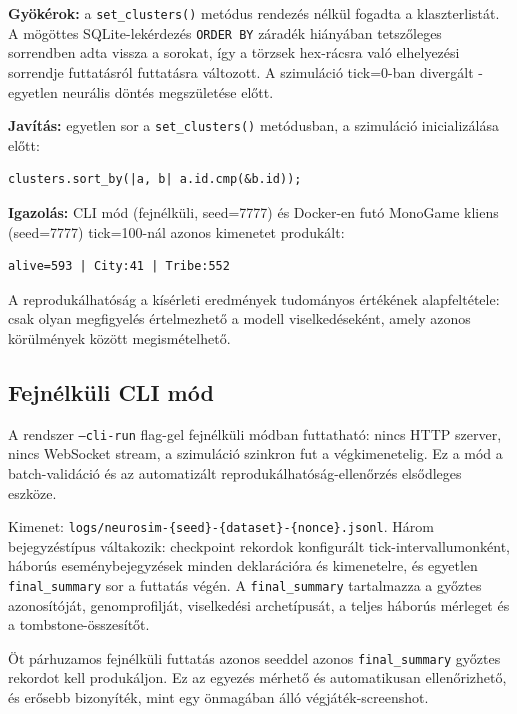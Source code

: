 ﻿\documentclass[a4paper,12pt]{report}
\begin{document}
\textbf{Gyökérok:} a \texttt{set\_clusters()} metódus rendezés nélkül fogadta
a klaszterlistát. A mögöttes SQLite-lekérdezés \texttt{ORDER BY} záradék hiányában
tetszőleges sorrendben adta vissza a sorokat, így a törzsek hex-rácsra való
elhelyezési sorrendje futtatásról futtatásra változott.
A szimuláció tick=0-ban divergált - egyetlen neurális döntés megszületése előtt.

\textbf{Javítás:} egyetlen sor a \texttt{set\_clusters()} metódusban,
a szimuláció inicializálása előtt:

\begin{lstlisting}[language={},caption={Determinizmus-javítás: klaszterek rendezése azonosító szerint}]
clusters.sort_by(|a, b| a.id.cmp(&b.id));
\end{lstlisting}

\textbf{Igazolás:} CLI mód (fejnélküli, seed=7777) és Docker-en futó MonoGame kliens
(seed=7777) tick=100-nál azonos kimenetet produkált:

\begin{lstlisting}[language={},caption={Determinizmus-ellenőrzés: CLI és MonoGame egyező eredménye tick=100-nál}]
alive=593 | City:41 | Tribe:552
\end{lstlisting}

A reprodukálhatóság a kísérleti eredmények tudományos értékének alapfeltétele:
csak olyan megfigyelés értelmezhető a modell viselkedéseként, amely azonos
körülmények között megismételhető.

\subsection*{Fejnélküli CLI mód}

A rendszer \texttt{--cli-run} flag-gel fejnélküli módban futtatható:
nincs HTTP szerver, nincs WebSocket stream, a szimuláció szinkron fut
a végkimenetelig. Ez a mód a batch-validáció és az automatizált reprodukálhatóság-ellenőrzés
elsődleges eszköze.

Kimenet: \texttt{logs/neurosim-\{seed\}-\{dataset\}-\{nonce\}.jsonl}.
Három bejegyzéstípus váltakozik: checkpoint rekordok konfigurált tick-intervallumonként,
háborús eseménybejegyzések minden deklarációra és kimenetelre,
és egyetlen \texttt{final\_summary} sor a futtatás végén.
A \texttt{final\_summary} tartalmazza a győztes azonosítóját, genomprofilját,
viselkedési archetípusát, a teljes háborús mérleget és a tombstone-összesítőt.

Öt párhuzamos fejnélküli futtatás azonos seeddel azonos \texttt{final\_summary}
győztes rekordot kell produkáljon. Ez az egyezés mérhető és automatikusan ellenőrizhető,
és erősebb bizonyíték, mint egy önmagában álló végjáték-screenshot.
\end{document}
